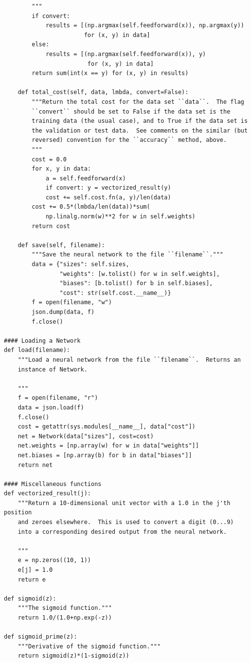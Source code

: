 \begin{lstlisting}
        """
        if convert:
            results = [(np.argmax(self.feedforward(x)), np.argmax(y))
                       for (x, y) in data]
        else:
            results = [(np.argmax(self.feedforward(x)), y)
                        for (x, y) in data]
        return sum(int(x == y) for (x, y) in results)

    def total_cost(self, data, lmbda, convert=False):
        """Return the total cost for the data set ``data``.  The flag
        ``convert`` should be set to False if the data set is the
        training data (the usual case), and to True if the data set is
        the validation or test data.  See comments on the similar (but
        reversed) convention for the ``accuracy`` method, above.
        """
        cost = 0.0
        for x, y in data:
            a = self.feedforward(x)
            if convert: y = vectorized_result(y)
            cost += self.cost.fn(a, y)/len(data)
        cost += 0.5*(lmbda/len(data))*sum(
            np.linalg.norm(w)**2 for w in self.weights)
        return cost

    def save(self, filename):
        """Save the neural network to the file ``filename``."""
        data = {"sizes": self.sizes,
                "weights": [w.tolist() for w in self.weights],
                "biases": [b.tolist() for b in self.biases],
                "cost": str(self.cost.__name__)}
        f = open(filename, "w")
        json.dump(data, f)
        f.close()

#### Loading a Network
def load(filename):
    """Load a neural network from the file ``filename``.  Returns an
    instance of Network.

    """
    f = open(filename, "r")
    data = json.load(f)
    f.close()
    cost = getattr(sys.modules[__name__], data["cost"])
    net = Network(data["sizes"], cost=cost)
    net.weights = [np.array(w) for w in data["weights"]]
    net.biases = [np.array(b) for b in data["biases"]]
    return net

#### Miscellaneous functions
def vectorized_result(j):
    """Return a 10-dimensional unit vector with a 1.0 in the j'th position
    and zeroes elsewhere.  This is used to convert a digit (0...9)
    into a corresponding desired output from the neural network.

    """
    e = np.zeros((10, 1))
    e[j] = 1.0
    return e

def sigmoid(z):
    """The sigmoid function."""
    return 1.0/(1.0+np.exp(-z))

def sigmoid_prime(z):
    """Derivative of the sigmoid function."""
    return sigmoid(z)*(1-sigmoid(z))

\end{lstlisting}


